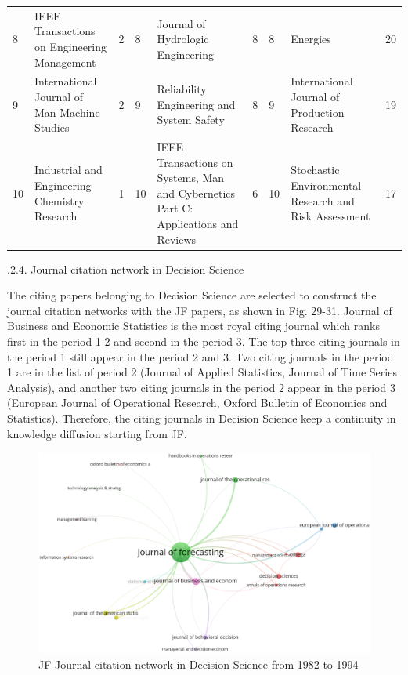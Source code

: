 \documentclass[11pt,a4paper]{elsarticle} %
\begin{document}
\begin{landscape}
\begin{table}[!htbp]
{\begin{tabular}{p{1.5cm}<{\centering} p{6cm}<{\centering} p{1.5cm}<{\centering}|p{1.5cm}<{\centering} p{6cm}<{\centering} p{1.5cm}<{\centering}|p{1.5cm}<{\centering} p{6cm}<{\centering} p{1.5cm}<{\centering}}
8 & IEEE Transactions on Engineering Management & 2 & 8 & Journal of Hydrologic Engineering & 8 & 8 & Energies & 20\\
9 & International Journal of Man-Machine Studies & 2 & 9 & Reliability Engineering and System Safety & 8 & 9 & International Journal of Production Research & 19\\
10 & Industrial and Engineering Chemistry Research & 1 & 10 & IEEE Transactions on Systems, Man and Cybernetics Part C: Applications and Reviews & 6 & 10 & Stochastic Environmental Research and Risk Assessment & 17\\
  \hline
  \hline
    \end{tabular}}
\end{table}
\end{landscape}

.2.4. Journal citation network in Decision Science

The citing papers belonging to Decision Science are selected to
construct the journal citation networks with the JF papers, as shown in
Fig. 29-31. Journal of Business and Economic Statistics is the most
royal citing journal which ranks first in the period 1-2 and second in
the period 3. The top three citing journals in the period 1 still appear
in the period 2 and 3. Two citing journals in the period 1 are in the
list of period 2 (Journal of Applied Statistics, Journal of Time Series
Analysis), and another two citing journals in the period 2 appear in the
period 3 (European Journal of Operational Research, Oxford Bulletin of
Economics and Statistics). Therefore, the citing journals in Decision
Science keep a continuity in knowledge diffusion starting from JF.

\begin{figure}[htbp]
\centering
\includegraphics[scale=0.3]{fig.29.eps}
\caption{JF Journal citation network in Decision Science from 1982 to 1994}
\end{figure}
\end{document}
